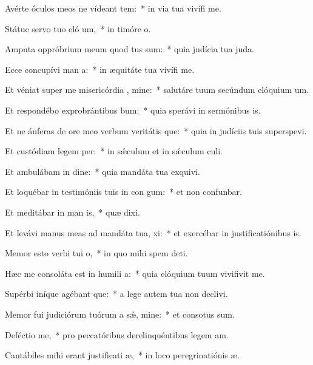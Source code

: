 \item Avérte óculos meos ne vídeant tem:~* in via tua vivífi me.
\item Státue servo tuo eló um,~* in timóre o.
\item Amputa oppróbrium meum quod tus sum:~* quia judícia tua juda.
\item Ecce concupívi man a:~* in æquitáte tua vivífi me.
\item Et véniat super me misericórdia , mine:~* salutáre tuum secúndum elóquium um.
\item Et respondébo exprobrántibus  bum:~* quia sperávi in sermónibus is.
\item Et ne áuferas de ore meo verbum veritátis que:~* quia in judíciis tuis superspevi.
\item Et custódiam legem  per:~* in sǽculum et in sǽculum culi.
\item Et ambulábam in dine:~* quia mandáta tua exquivi.
\item Et loquébar in testimóniis tuis in con gum:~* et non confunbar.
\item Et meditábar in man is,~* quæ dixi.
\item Et levávi manus meas ad mandáta tua,  xi:~* et exercébar in justificatiónibus is.
\item Memor esto verbi tui  o,~* in quo mihi spem deti.
\item Hæc me consoláta est in humili a:~* quia elóquium tuum vivifivit me.
\item Supérbi iníque agébant que:~* a lege autem tua non declivi.
\item Memor fui judiciórum tuórum a sǽ, mine:~* et consotus sum.
\item Deféctio  me,~* pro peccatóribus derelinquéntibus legem am.
\item Cantábiles mihi erant justificati æ,~* in loco peregrinatiónis æ.
